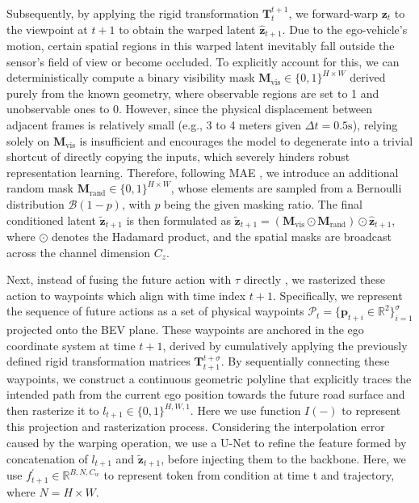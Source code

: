 Subsequently, by applying the rigid transformation $\mathbf{T}_{t}^{t+1}$, we forward-warp $\mathbf{z}_t$ to the viewpoint at $t+1$ to obtain the warped latent $\hat{\mathbf{z}}_{t+1}$. Due to the ego-vehicle's motion, certain spatial regions in this warped latent inevitably fall outside the sensor's field of view or become occluded. To explicitly account for this, we can deterministically compute a binary visibility mask $\mathbf{M}_{\text{vis}} \in \{0, 1\}^{H \times W}$ derived purely from the known geometry, where observable regions are set to 1 and unobservable ones to 0. However, since the physical displacement between adjacent frames is relatively small (e.g., 3 to 4 meters given $\Delta t = 0.5\text{s}$), relying solely on $\mathbf{M}_{\text{vis}}$ is insufficient and encourages the model to degenerate into a trivial shortcut of directly copying the inputs, which severely hinders robust representation learning. Therefore, following MAE \cite{he2022masked}, we introduce an additional random mask $\mathbf{M}_{\text{rand}} \in \{0, 1\}^{H \times W}$, whose elements are sampled from a Bernoulli distribution $\mathcal{B}(1 - p)$, with $p$ being the given masking ratio. The final conditioned latent $\tilde{\mathbf{z}}_{t+1}$ is then formulated as $\tilde{\mathbf{z}}_{t+1} = (\mathbf{M}_{\text{vis}} \odot \mathbf{M}_{\text{rand}}) \odot \hat{\mathbf{z}}_{t+1}$, where $\odot$ denotes the Hadamard product, and the spatial masks are broadcast across the channel dimension $C_z$. 

Next, instead of fusing the future action with $\tau$ directly \cite{gu2024dome, shi2025come}, we rasterized these action to waypoints which align with time index $t+1$. Specifically, we represent the sequence of future actions as a set of physical waypoints $\mathcal{P}_t = \{\mathbf{p}_{t+i} \in \mathbb{R}^2 \}_{i=1}^\sigma$ projected onto the BEV plane. These waypoints are anchored in the ego coordinate system at time $t+1$, derived by cumulatively applying the previously defined rigid transformation matrices $\mathbf{T}_{t+1}^{t+\sigma}$. By sequentially connecting these waypoints, we construct a continuous geometric polyline that explicitly traces the intended path from the current ego position towards the future road surface and then rasterize it to $l_{t+1} \in \{0, 1\}^{H, W, 1} $. Here we use function $I(-)$ to represent this projection and rasterization process. Considering the interpolation error caused by the warping operation, we use a U-Net to refine the feature formed by concatenation of $l_{t+1}$ and $\tilde{\mathbf{z}}_{t+1}$, before injecting them to the backbone. Here, we use $f^{\prime}_{t+1} \in \mathbb{R}^{B,N,C_w}$ to represent token from condition at time t and trajectory, where $N = H \times W$.

